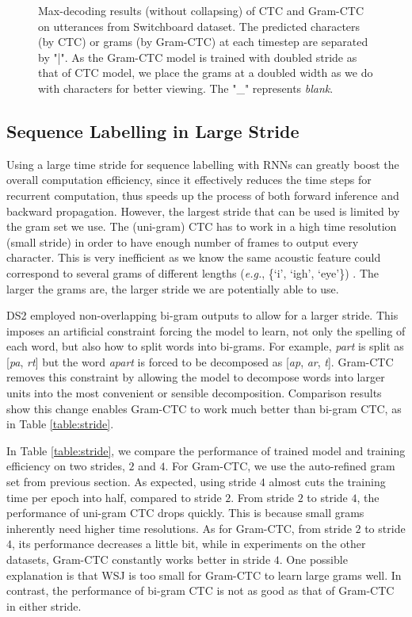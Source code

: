 \documentclass{article}
\begin{document}
\begin{figure*}[ht]
\centering
{}
\caption{Max-decoding results (without collapsing) of CTC and Gram-CTC on utterances from Switchboard dataset. The predicted characters (by CTC) or grams  (by Gram-CTC) at each timestep are separated by "|". As the Gram-CTC model is trained with doubled stride as that of CTC model, we place the grams at a doubled width as we do with characters for better viewing. The "\_" represents {\it blank}. }
\label{fig:examples}
\end{figure*}


\subsection{Sequence Labelling in Large Stride}

Using a large time stride for sequence labelling with RNNs can greatly boost the overall computation efficiency, since it effectively reduces the time steps for recurrent computation, thus speeds up the process of both forward inference and backward propagation. However, the largest stride that can be used is limited by the gram set we use. The (uni-gram) CTC has to work in a high time resolution (small stride) in order to have enough number of frames to output every character. This is very inefficient as we know the same acoustic feature could correspond to several grams of different lengths (\textit{e.g.}, \{`i', `igh', `eye'\}) . The larger the grams are, the larger stride we are potentially able to use.

DS2 \cite{amodei2015deep} employed non-overlapping bi-gram outputs to allow for a larger stride. This imposes an artificial constraint forcing the model to learn, not only the spelling of each word, but also how to split words into bi-grams. For example, \textit{part} is split as [\textit{pa}, \textit{rt}] but the word \textit{apart} is forced to be decomposed as [\textit{ap}, \textit{ar}, \textit{t}]. Gram-CTC removes this constraint by allowing the model to decompose words into larger units into the most convenient or sensible decomposition. Comparison results show this change enables Gram-CTC to work much better than bi-gram CTC, as in Table \ref{table:stride}.

In Table \ref{table:stride}, we compare the performance of trained model and training efficiency on two strides, $2$ and $4$. For Gram-CTC, we use the auto-refined gram set from previous section. As expected, using stride $4$ almost cuts the training time per epoch into half, compared to stride $2$. 
From stride $2$ to stride $4$, the performance of uni-gram CTC drops quickly. This is because small grams inherently need higher time resolutions. 
As for Gram-CTC, from stride $2$ to stride $4$, its performance decreases a little bit, while in experiments on the other datasets, Gram-CTC constantly works better in stride $4$. 
One possible explanation is that WSJ is too small for Gram-CTC to learn large grams well.
In contrast, the performance of bi-gram CTC is not as good as that of Gram-CTC in either stride.
\end{document}
